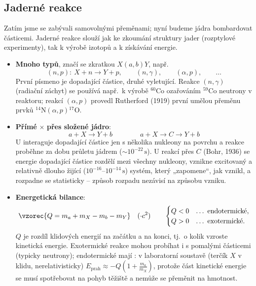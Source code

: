 \subsection{Jaderné reakce}

Zatím jsme se zabývali samovolnými přeměnami; nyní budeme jádra bombardovat částicemi. Jaderné reakce slouží jak ke zkoumání
struktury jader (rozptylové experimenty), tak k výrobě izotopů a k získávání energie.
\begin{itemize}
  \item \textbf{Mnoho typů}, značí se zkratkou \(X(a,b)Y\), např.
  \[
    (n,p):\ X + n \to Y + p,\qquad (n,\gamma),\qquad (\alpha,p),\qquad \dots
  \]
  První písmeno je dopadající částice, druhé vyletující. Reakce \((n,\gamma)\) (radiační záchyt) se používá např.\ k výrobě
  \({}^{60}\mathrm{Co}\) ozařováním \({}^{59}\mathrm{Co}\) neutrony v reaktoru; reakcí \((\alpha,p)\) provedl Rutherford (1919)
  první umělou přeměnu prvků \({}^{14}\mathrm{N}(\alpha,p){}^{17}\mathrm{O}\).
  \item \textbf{Přímé} \(\times\) \textbf{přes složené jádro}:
  \[
    a + X \to Y + b \qquad\qquad a + X \to C \to Y + b
  \]
  U  interaguje dopadající částice jen s několika nukleony na povrchu a reakce proběhne za dobu průletu jádrem
  (\(\sim10^{-22}\,\mathrm{s}\)). U reakcí přes  \(C\) (Bohr, 1936) se energie dopadající částice rozdělí mezi všechny
  nukleony, vznikne excitovaný a relativně dlouho žijící (\(10^{-16}\)--\(10^{-14}\,\mathrm{s}\)) systém, který „zapomene“, jak vznikl, a
  rozpadne se statisticky -- způsob rozpadu nezávisí na způsobu vzniku.
  \item \textbf{Energetická bilance}:
  \[
    \vzorec{Q = m_a + m_X - m_b - m_Y}\quad(\cdot c^2)
    \qquad
    \begin{cases}
      Q<0 & \dots\ \text{endotermické},\\
      Q>0 & \dots\ \text{exotermické}.
    \end{cases}
  \]
  \(Q\) je rozdíl klidových energií na začátku a na konci, tj.\ o kolik vzroste kinetická energie. Exotermické reakce
  mohou probíhat i s pomalými částicemi (typicky neutrony); endotermické mají : v laboratorní soustavě
  (terčík \(X\) v klidu, nerelativisticky) \(E_\text{prah} \approx -Q\left(1+\frac{m_a}{m_X}\right)\), protože část kinetické
  energie se musí spotřebovat na pohyb těžiště a nemůže se přeměnit na hmotnost.
\end{itemize}


